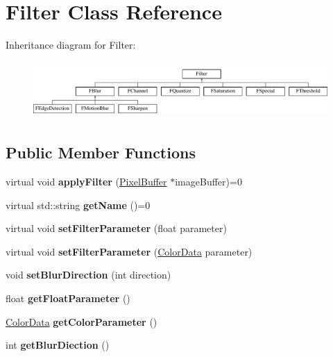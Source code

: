 \hypertarget{classFilter}{}\section{Filter Class Reference}
\label{classFilter}
Inheritance diagram for Filter\+:\begin{figure}[H]
\begin{center}
\leavevmode
\includegraphics[height=2.181818cm]{classFilter}
\end{center}
\end{figure}
\subsection*{Public Member Functions}
\begin{DoxyCompactItemize}
\item 
virtual void {\bfseries apply\+Filter} (\hyperlink{classPixelBuffer}{Pixel\+Buffer} $\ast$image\+Buffer)=0\hypertarget{classFilter_a2ecb4bc0e81851d30f46f30bf81d1739}{}\label{classFilter_a2ecb4bc0e81851d30f46f30bf81d1739}

\item 
virtual std\+::string {\bfseries get\+Name} ()=0\hypertarget{classFilter_a212f40acb6481b2e36c3d129007519f1}{}\label{classFilter_a212f40acb6481b2e36c3d129007519f1}

\item 
virtual void {\bfseries set\+Filter\+Parameter} (float parameter)\hypertarget{classFilter_aba015e9da647ba41fee4b41019d54516}{}\label{classFilter_aba015e9da647ba41fee4b41019d54516}

\item 
virtual void {\bfseries set\+Filter\+Parameter} (\hyperlink{classColorData}{Color\+Data} parameter)\hypertarget{classFilter_a88314088e678c9a7cdbe0d0557385fa8}{}\label{classFilter_a88314088e678c9a7cdbe0d0557385fa8}

\item 
void {\bfseries set\+Blur\+Direction} (int direction)\hypertarget{classFilter_ada9d5f112e217c9bcf413093eae2a1e9}{}\label{classFilter_ada9d5f112e217c9bcf413093eae2a1e9}

\item 
float {\bfseries get\+Float\+Parameter} ()\hypertarget{classFilter_a9f741b045bf1d57e485f116ce62ebac1}{}\label{classFilter_a9f741b045bf1d57e485f116ce62ebac1}

\item 
\hyperlink{classColorData}{Color\+Data} {\bfseries get\+Color\+Parameter} ()\hypertarget{classFilter_abf85cdf0cda6dbe1dbcd6b8813aeecf3}{}\label{classFilter_abf85cdf0cda6dbe1dbcd6b8813aeecf3}

\item 
int {\bfseries get\+Blur\+Diection} ()\hypertarget{classFilter_a465a168fc580c773e58d4df2f3db5968}{}\label{classFilter_a465a168fc580c773e58d4df2f3db5968}

\end{DoxyCompactItemize}
